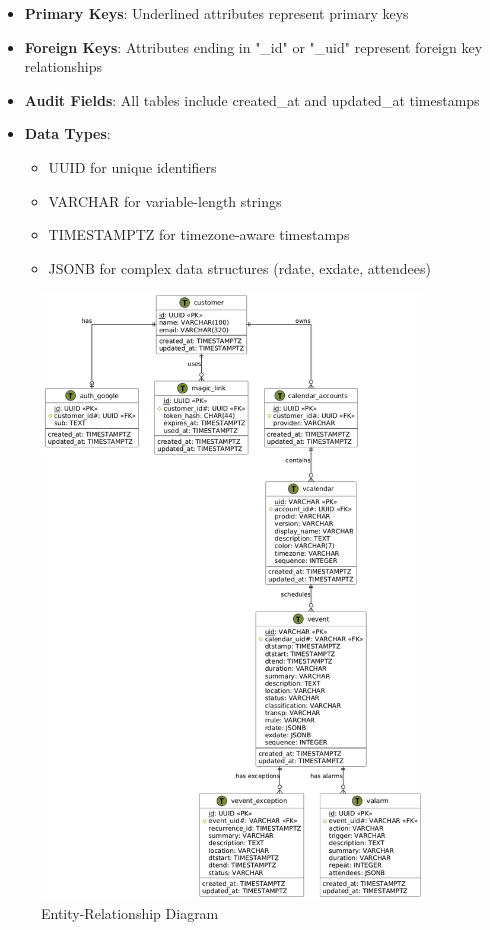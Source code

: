 \documentclass[12pt,a4paper,twoside]{report}
\begin{document}
\begin{itemize}
    \item \textbf{Primary Keys}: Underlined attributes represent primary keys
    \item \textbf{Foreign Keys}: Attributes ending in "\_id" or "\_uid" represent foreign key relationships
    \item \textbf{Audit Fields}: All tables include created\_at and updated\_at timestamps
    \item \textbf{Data Types}:
          \begin{itemize}
              \item UUID for unique identifiers
              \item VARCHAR for variable-length strings
              \item TIMESTAMPTZ for timezone-aware timestamps
              \item JSONB for complex data structures (rdate, exdate, attendees)
          \end{itemize}
\end{itemize}

\begin{figure}[!h]
    \centering
    \includegraphics[width=0.9\textwidth]{images/docs/diagrams/er/database/Database Design.png}
    \caption{Entity-Relationship Diagram}
    \label{fig:er-diagram}
\end{figure}
\end{document}
